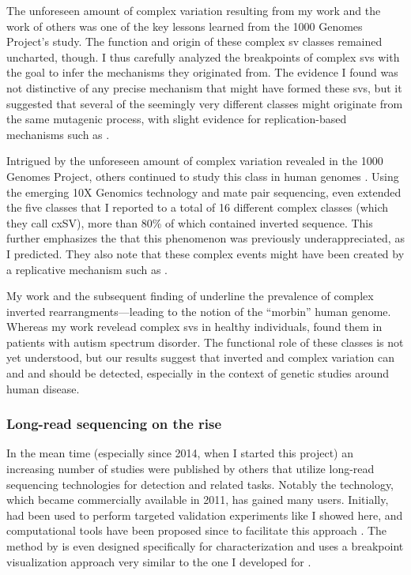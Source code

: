 The unforeseen amount of complex variation resulting from my work and the work
of others was one of the key lessons learned from the 1000 Genomes Project's \sv
study. The function and origin of these complex sv classes remained uncharted,
though. I thus carefully analyzed the breakpoints of complex \acp{sv} with the
goal to infer the mechanisms they originated from. The evidence I found was not
distinctive of any precise mechanism that might have formed these \acp{sv}, but
it suggested that several of the seemingly very different classes might
originate from the same mutagenic process, with slight evidence for replication-based
mechanisms such as \mmbir.

Intrigued by the unforeseen amount of complex variation revealed in the 1000 Genomes
Project, others continued to study this \sv class in human genomes \citep{Chaisson2014,Collins2017}.
Using the emerging 10X Genomics technology and mate pair sequencing, \citet{Collins2017} even extended
the five classes that I reported to a total of 16 different complex \sv classes
(which they call cxSV), more than 80\% of which contained inverted sequence.
This further emphasizes the that this phenomenon was previously underappreciated,
as I predicted. They also note that these complex events might have been created
by a replicative mechanism such as \mmbir.

My work and the subsequent finding of \citet{Collins2017} underline the
prevalence of complex inverted rearrangments---leading to the notion of the ``morbin''
human genome. Whereas my work revelead complex \acp{sv} in healthy individuals,
 found them in patients with autism spectrum disorder. The
functional role of these \sv classes is not yet understood, but our results
suggest that inverted and complex variation can and and should be detected,
especially in the context of genetic studies around human disease.




\subsubsection{Long-read sequencing on the rise}

In the mean time (especially since 2014, when I started this project) an
increasing number of studies were published by others that utilize long-read
sequencing technologies for \sv detection and related tasks.
Notably the \pacbio technology, which became commercially
available in 2011, has gained many users. Initially, \pacbio had been used to
perform targeted validation experiments like I showed here, and computational tools
have been proposed since to facilitate this approach \citep{Wang2015,Rudewicz2016}.
The method by \citet{Wang2015} is even designed specifically for \sv
characterization and uses a breakpoint visualization approach very similar to
the one I developed for \maze.

